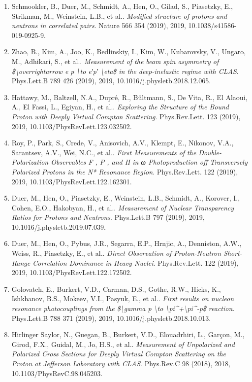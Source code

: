 \begin{enumerate}
\item Schmookler, B., Duer, M., Schmidt, A., Hen, O., Gilad, S., Piasetzky, E., Strikman, M., Weinstein, L.B., et al.. \textit{Modified structure of protons and neutrons in correlated pairs}. Nature 566 354 (2019), 2019, 10.1038/s41586-019-0925-9.
\item Zhao, B., Kim, A., Joo, K., Bedlinskiy, I., Kim, W., Kubarovsky, V., Ungaro, M., Adhikari, S., et al.. \textit{Measurement of the beam spin asymmetry of \$\textbackslash{}overrightarrow e p \textbackslash{}to e′p′ \textbackslash{}eta\$ in the deep-inelastic regime with CLAS}. Phys.Lett.B 789 426 (2019), 2019, 10.1016/j.physletb.2018.12.065.
\item Hattawy, M., Baltzell, N.A., Dupré, R., Bültmann, S., De Vita, R., El Alaoui, A., El Fassi, L., Egiyan, H., et al.. \textit{Exploring the Structure of the Bound Proton with Deeply Virtual Compton Scattering}. Phys.Rev.Lett. 123 (2019), 2019, 10.1103/PhysRevLett.123.032502.
\item Roy, P., Park, S., Crede, V., Anisovich, A.V., Klempt, E., Nikonov, V.A., Sarantsev, A.V., Wei, N.C., et al.. \textit{First Measurements of the Double-Polarization Observables F , P , and H in ω Photoproduction off Transversely Polarized Protons in the N* Resonance Region}. Phys.Rev.Lett. 122 (2019), 2019, 10.1103/PhysRevLett.122.162301.
\item Duer, M., Hen, O., Piasetzky, E., Weinstein, L.B., Schmidt, A., Korover, I., Cohen, E.O., Hakobyan, H., et al.. \textit{Measurement of Nuclear Transparency Ratios for Protons and Neutrons}. Phys.Lett.B 797 (2019), 2019, 10.1016/j.physletb.2019.07.039.
\item Duer, M., Hen, O., Pybus, J.R., Segarra, E.P., Hrnjic, A., Denniston, A.W., Weiss, R., Piasetzky, E., et al.. \textit{Direct Observation of Proton-Neutron Short-Range Correlation Dominance in Heavy Nuclei}. Phys.Rev.Lett. 122 (2019), 2019, 10.1103/PhysRevLett.122.172502.
\item Golovatch, E., Burkert, V.D., Carman, D.S., Gothe, R.W., Hicks, K., Ishkhanov, B.S., Mokeev, V.I., Pasyuk, E., et al.. \textit{First results on nucleon resonance photocouplings from the \$\textbackslash{}gamma p \textbackslash{}to \textbackslash{}pi\textasciicircum{}+\textbackslash{}pi\textasciicircum{}-p\$ reaction}. Phys.Lett.B 788 371 (2019), 2019, 10.1016/j.physletb.2018.10.013.
\item Hirlinger Saylor, N., Guegan, B., Burkert, V.D., Elouadrhiri, L., Garçon, M., Girod, F.X., Guidal, M., Jo, H.S., et al.. \textit{Measurement of Unpolarized and Polarized Cross Sections for Deeply Virtual Compton Scattering on the Proton at Jefferson Laboratory with CLAS}. Phys.Rev.C 98 (2018), 2018, 10.1103/PhysRevC.98.045203.

\end{enumerate}
